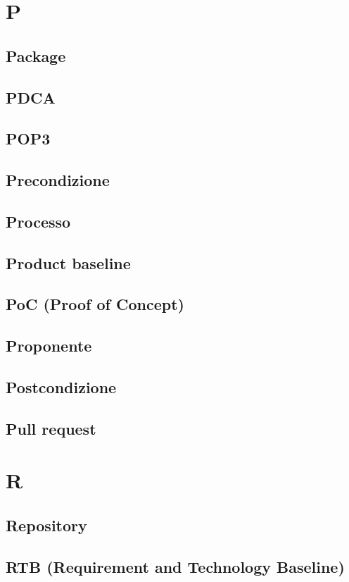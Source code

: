 \documentclass[12pt]{article}
\begin{document}
	\section{P}
		\subsection{Package}
		\subsection{PDCA} %
		\subsection{POP3}
		\subsection{Precondizione}
		\subsection{Processo}
		\subsection{Product baseline}
		\subsection{PoC (Proof of Concept)}
		\subsection{Proponente}
		\subsection{Postcondizione}
		\subsection{Pull request}
	\clearpage
	\section{R}
		\subsection{Repository}
		\subsection{RTB (Requirement and Technology Baseline)}
\end{document}
